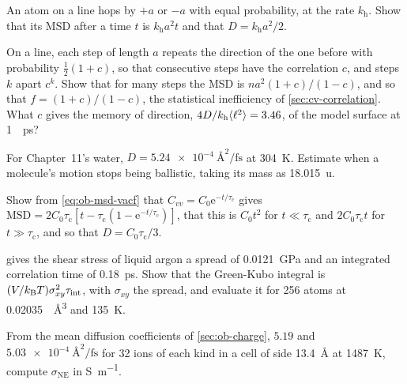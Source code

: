 \begin{exercise}
\label{ex:ob-walk}
An atom on a line hops by $+a$ or $-a$ with equal probability, at the
rate $k_{\mathrm h}$. Show that its MSD after a time $t$ is $k_{\mathrm
h}a^2t$ and that $D = k_{\mathrm h}a^2/2$.
\end{exercise}

\begin{exercise}
\label{ex:ob-correlated}
On a line, each step of length $a$ repeats the direction of the one
before with probability $\frac12(1 + c)$, so that consecutive steps have
the correlation $c$, and steps $k$ apart $c^k$. Show that for many steps
the MSD is $na^2(1 + c)/(1 - c)$, and so that $f = (1 + c)/(1 - c)$, the
statistical inefficiency of \cref{sec:cv-correlation}. What $c$ gives the
memory of direction, $4D/k_{\mathrm h}\langle \ell^2 \rangle = 3.46$, of the model
surface at \SI{1}{\per\pico\second}?
\end{exercise}

\begin{exercise}
\label{ex:ob-water}
For Chapter~11's water, $D = \SI{5.24e-4}{\angstrom\squared\per\femto
\second}$ at \SI{304}{\kelvin}. Estimate when a molecule's motion stops
being ballistic, taking its mass as \SI{18.015}{\amu}.
\end{exercise}

\begin{exercise}
\label{ex:ob-exp}
Show from \cref{eq:ob-msd-vacf} that $C_{vv} = C_0\mathrm{e}^{-t/\tau_{\mathrm
c}}$ gives $\text{MSD} = 2C_0\tau_{\mathrm c}[t - \tau_{\mathrm c}(1 -
\mathrm{e}^{-t/\tau_{\mathrm c}})]$, that this is $C_0t^2$ for $t \ll
\tau_{\mathrm c}$ and $2C_0\tau_{\mathrm c}t$ for $t \gg \tau_{\mathrm c}$,
and so that $D = C_0\tau_{\mathrm c}/3$.
\end{exercise}

\begin{exercise}
\label{ex:ob-eta}
 gives the shear stress of liquid argon a
spread of \SI{0.0121}{\giga\pascal} and an integrated correlation time of
\SI{0.18}{\pico\second}. Show that the Green-Kubo integral is $(V/k_{\mathrm{B}} T)
\sigma_{xy}^2\tau_{\mathrm{int}}$, with $\sigma_{xy}$ the spread, and
evaluate it
for 256 atoms at \SI{0.02035}{\per\angstrom\cubed} and \SI{135}{\kelvin}.
\end{exercise}

\begin{exercise}
\label{ex:ob-ne}
From the mean diffusion coefficients of \cref{sec:ob-charge}, $5.19$ and
$\SI{5.03e-4}{\angstrom\squared\per\femto\second}$ for 32 ions of each
kind in a cell of side \SI{13.4}{\angstrom} at \SI{1487}{\kelvin},
compute $\sigma_{\mathrm{NE}}$ in \si{\siemens\per\metre}.
\end{exercise}

